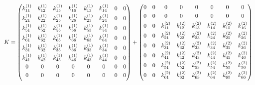 \begin{equation*}
K = \begin{pmatrix}
k_{11}^{\left(1\right)} & k_{12}^{\left(1\right)} &  k_{15}^{\left(1\right)} &  k_{16}^{\left(1\right)} & k_{13}^{\left(1\right)}  & k_{14}^{\left(1\right)} & 0 & 0   \\[0.3em]
k_{21}^{\left(1\right)} & k_{22}^{\left(1\right)} &  k_{25}^{\left(1\right)} &  k_{26}^{\left(1\right)} & k_{23}^{\left(1\right)}  & k_{24}^{\left(1\right)} & 0 & 0   \\[0.3em]
k_{51}^{\left(1\right)} & k_{52}^{\left(1\right)} &  k_{55}^{\left(1\right)} &  k_{56}^{\left(1\right)} & k_{53}^{\left(1\right)}  & k_{54}^{\left(1\right)} & 0 & 0   \\[0.3em]
k_{61}^{\left(1\right)} & k_{62}^{\left(1\right)} &  k_{65}^{\left(1\right)} &  k_{66}^{\left(1\right)} & k_{63}^{\left(1\right)}  & k_{64}^{\left(1\right)}  & 0 & 0  \\[0.3em]
k_{31}^{\left(1\right)} & k_{32}^{\left(1\right)} &  k_{35}^{\left(1\right)} &  k_{36}^{\left(1\right)} & k_{33}^{\left(1\right)}  & k_{34}^{\left(1\right)}  & 0 & 0  \\[0.3em]
k_{41}^{\left(1\right)} & k_{42}^{\left(1\right)} &  k_{45}^{\left(1\right)} &  k_{46}^{\left(1\right)} & k_{43}^{\left(1\right)}  & k_{44}^{\left(1\right)}  & 0 & 0  \\[0.3em]
0 & 0 & 0 & 0 & 0 & 0 & 0 & 0 \\[0.3em]
0 & 0 & 0 & 0 & 0 & 0 & 0 & 0 \\[0.3em]
\end{pmatrix} + \begin{pmatrix}
0 & 0 & 0 & 0 & 0 & 0 & 0 & 0 \\[0.3em]
0 & 0 & 0 & 0 & 0 & 0 & 0 & 0 \\[0.3em]
0 & 0 &k_{11}^{\left(2\right)} & k_{12}^{\left(2\right)} &  k_{13}^{\left(2\right)} &  k_{14}^{\left(2\right)} & k_{15}^{\left(2\right)}  & k_{16}^{\left(2\right)}   \\[0.3em]
0 & 0 & k_{21}^{\left(2\right)} & k_{22}^{\left(2\right)} &  k_{23}^{\left(2\right)} &  k_{24}^{\left(2\right)} & k_{25}^{\left(2\right)}  & k_{26}^{\left(2\right)}   \\[0.3em]
0 & 0 & k_{31}^{\left(2\right)} & k_{32}^{\left(2\right)} &  k_{33}^{\left(2\right)} &  k_{34}^{\left(2\right)} & k_{35}^{\left(2\right)}  & k_{36}^{\left(2\right)}    \\[0.3em]
0 & 0 & k_{41}^{\left(2\right)} & k_{42}^{\left(2\right)} &  k_{43}^{\left(2\right)} &  k_{44}^{\left(2\right)} & k_{45}^{\left(2\right)}  & k_{46}^{\left(2\right)}    \\[0.3em]
0 & 0 & k_{51}^{\left(2\right)} & k_{52}^{\left(2\right)} &  k_{53}^{\left(2\right)} &  k_{54}^{\left(2\right)} & k_{55}^{\left(2\right)}  & k_{56}^{\left(2\right)}   \\[0.3em]
0 & 0 & k_{61}^{\left(2\right)} & k_{62}^{\left(2\right)} &  k_{63}^{\left(2\right)} &  k_{64}^{\left(2\right)} & k_{65}^{\left(2\right)}  & k_{66}^{\left(2\right)}    \\[0.3em]
\end{pmatrix} \\
\end{equation*}
